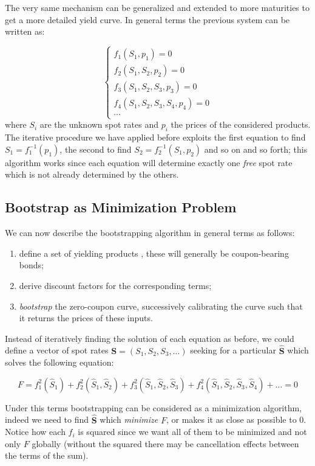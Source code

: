 The very same mechanism can be generalized and extended to more maturities to get a more detailed yield curve. In general terms the previous system can be written as:

\begin{equation*}
\begin{cases}
f_1(S_1, p_1) = 0 \\
f_2(S_1, S_2, p_2) = 0 \\
f_3(S_1, S_2, S_3, p_3) = 0 \\
f_4(S_1, S_2, S_3, S_4, p_4) = 0 \\
\cdots
\end{cases}
\end{equation*}
where $S_i$ are the unknown spot rates and $p_i$ the prices of the considered products. The iterative procedure we have applied before exploits the first equation to find $S_1 = f_1^{-1}(p_1)$, the second to find $S_2 = f_2^{-1}(S_1, p_2)$ and so on and so forth; this algorithm works since each equation will determine exactly one \emph{free} spot rate which is not already determined by the others.

\subsection{Bootstrap as Minimization Problem}
We can now describe the bootstrapping algorithm in general terms as follows:
\begin{enumerate}
\item define a set of yielding products , these will generally be coupon-bearing bonds;
\item derive discount factors for the corresponding terms;
\item \emph{bootstrap} the zero-coupon curve, successively calibrating the curve such that it returns the prices of these inputs.
\end{enumerate}

Instead of iteratively finding the solution of each equation as before, we could define a vector of spot rates $\mathbf{S} = (S_1, S_2, S_3, \ldots)$ seeking for a particular $\mathbf{\hat{S}}$ which solves the following equation:

\begin{equation*}
F = f_1^2(\hat{S}_1) + f_2^2(\hat{S}_1, \hat{S}_2) + f_3^2(\hat{S}_1, \hat{S}_2, \hat{S}_3) + f_4^2(\hat{S}_1, \hat{S}_2, \hat{S}_3, \hat{S}_4) + \ldots = 0
\end{equation*}

Under this terms bootstrapping can be considered as a minimization algorithm, indeed we need to find $\mathbf{\hat{S}}$ which \emph{minimize} $F$, or makes it as close as possible to 0.
Notice how each \(f_i\) is squared since we want all of them to be minimized and
not only \(F\) globally (without the squared there may be cancellation
effects between the terms of the sum).

